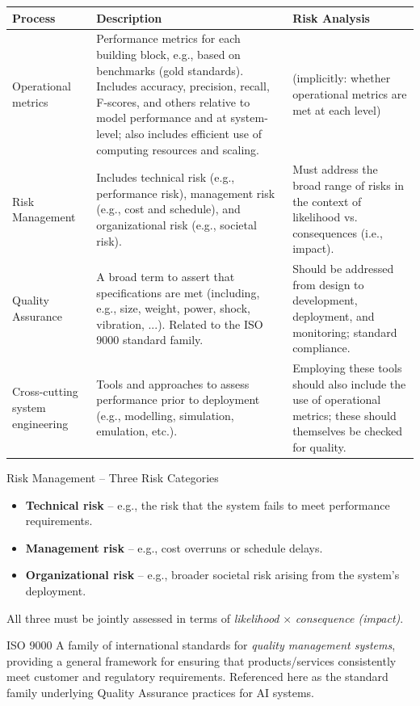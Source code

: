 \begin{center}
\begin{tabular}{p{3cm}p{4.6cm}p{4.6cm}}
\toprule
\textbf{Process} & \textbf{Description} & \textbf{Risk Analysis} \\
\midrule
Operational metrics & Performance metrics for each building block, e.g., based on benchmarks (gold standards). Includes accuracy, precision, recall, F-scores, and others relative to model performance and at system-level; also includes efficient use of computing resources and scaling. & (implicitly: whether operational metrics are met at each level) \\[0.2cm]
Risk Management & Includes technical risk (e.g., performance risk), management risk (e.g., cost and schedule), and organizational risk (e.g., societal risk). & Must address the broad range of risks in the context of likelihood vs. consequences (i.e., impact). \\[0.2cm]
Quality Assurance & A broad term to assert that specifications are met (including, e.g., size, weight, power, shock, vibration, ...). Related to the ISO 9000 standard family. & Should be addressed from design to development, deployment, and monitoring; standard compliance. \\[0.2cm]
Cross-cutting system engineering & Tools and approaches to assess performance prior to deployment (e.g., modelling, simulation, emulation, etc.). & Employing these tools should also include the use of operational metrics; these should themselves be checked for quality. \\
\bottomrule
\end{tabular}
\end{center}

\begin{defbox}{Risk Management -- Three Risk Categories}
\begin{itemize}
    \item \textbf{Technical risk} -- e.g., the risk that the system fails to meet performance requirements.
    \item \textbf{Management risk} -- e.g., cost overruns or schedule delays.
    \item \textbf{Organizational risk} -- e.g., broader societal risk arising from the system's deployment.
\end{itemize}
All three must be jointly assessed in terms of \emph{likelihood} $\times$ \emph{consequence (impact)}.
\end{defbox}

\begin{defbox}{ISO 9000}
A family of international standards for \emph{quality management systems}, providing a general framework for ensuring that products/services consistently meet customer and regulatory requirements. Referenced here as the standard family underlying Quality Assurance practices for AI systems.
\end{defbox}

